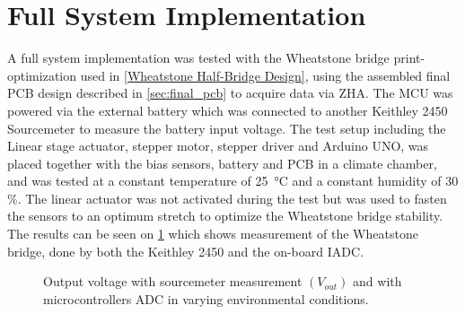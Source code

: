 \section{Full System Implementation}
A full system implementation was tested with the Wheatstone bridge print-optimization used in \cref{Wheatstone Half-Bridge Design}, using the assembled final PCB design described in \cref{sec:final_pcb} to acquire data via ZHA. The MCU was powered via the external battery which was connected to another Keithley 2450 Sourcemeter to measure the battery input voltage. The test setup including the Linear stage actuator, stepper motor, stepper driver and Arduino UNO, was placed together with the bias sensors, battery and PCB in a climate chamber, and was tested at a constant temperature of \SI{25}{\celsius} and a constant humidity of 30 \%. The linear actuator was not activated during the test but was used to fasten the sensors to an optimum stretch to optimize the Wheatstone bridge stability. The results can be seen on \cref{fig:FS_ADCogVout} which shows measurement of the Wheatstone bridge, done by both the Keithley 2450 and the on-board IADC.

\begin{figure}[H]
\centering

    \caption{Output voltage with sourcemeter measurement $\left( V_{out}\right)$ and with microcontrollers ADC in varying environmental conditions.}
    \label{fig:FS_ADCogVout}
\end{figure}



